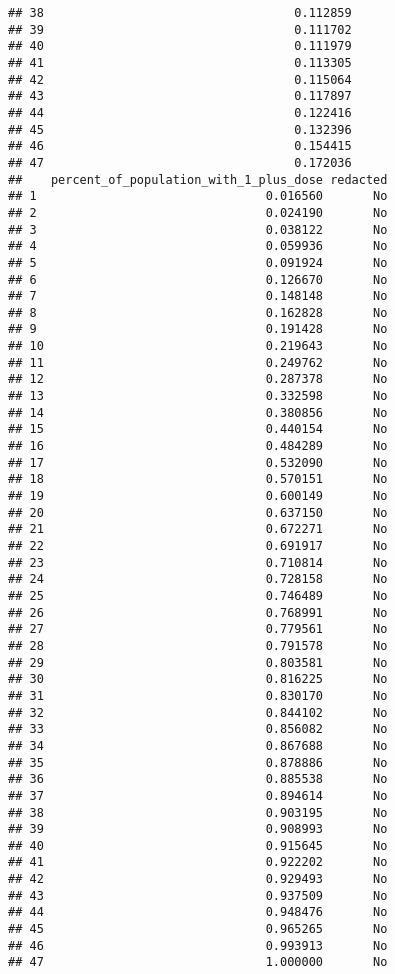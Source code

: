 \documentclass[
]{article}
\begin{document}
\begin{verbatim}
## 38                                   0.112859
## 39                                   0.111702
## 40                                   0.111979
## 41                                   0.113305
## 42                                   0.115064
## 43                                   0.117897
## 44                                   0.122416
## 45                                   0.132396
## 46                                   0.154415
## 47                                   0.172036
##    percent_of_population_with_1_plus_dose redacted
## 1                                0.016560       No
## 2                                0.024190       No
## 3                                0.038122       No
## 4                                0.059936       No
## 5                                0.091924       No
## 6                                0.126670       No
## 7                                0.148148       No
## 8                                0.162828       No
## 9                                0.191428       No
## 10                               0.219643       No
## 11                               0.249762       No
## 12                               0.287378       No
## 13                               0.332598       No
## 14                               0.380856       No
## 15                               0.440154       No
## 16                               0.484289       No
## 17                               0.532090       No
## 18                               0.570151       No
## 19                               0.600149       No
## 20                               0.637150       No
## 21                               0.672271       No
## 22                               0.691917       No
## 23                               0.710814       No
## 24                               0.728158       No
## 25                               0.746489       No
## 26                               0.768991       No
## 27                               0.779561       No
## 28                               0.791578       No
## 29                               0.803581       No
## 30                               0.816225       No
## 31                               0.830170       No
## 32                               0.844102       No
## 33                               0.856082       No
## 34                               0.867688       No
## 35                               0.878886       No
## 36                               0.885538       No
## 37                               0.894614       No
## 38                               0.903195       No
## 39                               0.908993       No
## 40                               0.915645       No
## 41                               0.922202       No
## 42                               0.929493       No
## 43                               0.937509       No
## 44                               0.948476       No
## 45                               0.965265       No
## 46                               0.993913       No
## 47                               1.000000       No
\end{verbatim}
\end{document}
